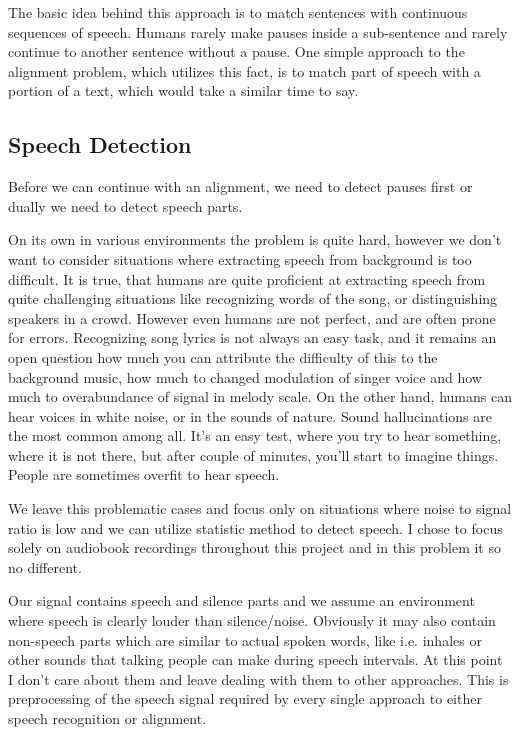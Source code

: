 \documentclass[12pt,a4paper,english]{article}
\begin{document}
The basic idea behind this approach is to match sentences with continuous sequences of speech.
Humans rarely make pauses inside a sub-sentence and rarely continue to another sentence without a pause. \newline
One simple approach to the alignment problem, which utilizes this fact, is to match part of speech with a portion of a text,
which would take a similar time to say. \newline \newline

\subsection{Speech Detection}

Before we can continue with an alignment, we need to detect pauses first or dually we need to detect speech parts. \newline

On its own in various environments  the problem is quite hard, however we don't want to consider situations where extracting speech from background is too difficult. It is true, that humans are quite proficient at extracting speech from quite challenging situations like recognizing words of the song, or distinguishing speakers in a crowd.
However even humans are not perfect, and are often prone for errors. Recognizing song lyrics is not always an easy task, and it remains an open question how much you can attribute the difficulty of this to the background music, how much to changed modulation of singer voice and how much to overabundance of signal in melody scale.
On the other hand, humans can hear voices in white noise, or in the sounds of nature. Sound hallucinations are the most common among all. It's an easy test, where you try to hear something, where it is not there, but after couple of minutes, you'll start to imagine things. People are sometimes overfit to hear speech. \newline

We leave this problematic cases and focus only on situations where noise to signal ratio is low and we can utilize statistic method to detect speech.
I chose to focus solely on audiobook recordings throughout this project and in this problem it so no different.\newline

Our signal contains speech and silence parts and we assume an environment where speech is clearly louder than silence/noise. Obviously it may also contain non-speech parts which are similar to actual spoken words, like i.e. inhales or other sounds that talking people can make during speech intervals. At this point I don't care about them and leave dealing with them to other approaches. \newline
This is preprocessing of the speech signal required by every single approach to either speech recognition or alignment. 
\end{document}
